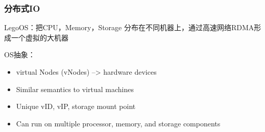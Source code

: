 \begin{frame}[fragile]
    \frametitle{分布式IO}
    LegoOS：把CPU，Memory，Storage 分布在不同机器上，通过高速网络RDMA形成一个虚拟的大机器
    
    OS抽象：
    \begin{itemize}
        \item virtual Nodes (vNodes)  --> hardware devices
        \item Similar semantics to virtual machines
        \item Unique vID, vIP, storage mount point
        \item  Can run on multiple processor, memory, and storage components    
    \end{itemize}
    
\end{frame}

